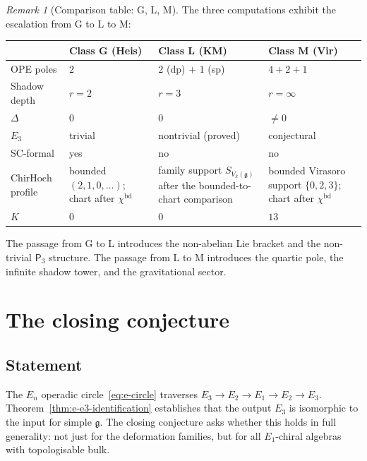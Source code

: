 \documentclass[11pt,reqno]{amsart}
\theoremstyle{definition}
\theoremstyle{remark}
\newtheorem{remark}[theorem]{Remark}
\providecommand{\fg}{\mathfrak{g}}
\providecommand{\Eone}{E_1}
\providecommand{\Etwo}{E_2}
\providecommand{\Ethree}{E_3}
\providecommand{\En}{E_n}
\providecommand{\Pthree}{\mathsf{P}_3}
\providecommand{\ChirHoch}{\mathrm{ChirHoch}}
\begin{document}
\begin{remark}[Comparison table: G, L, M]
\label{rem:e-glm-comparison}
The three computations exhibit the escalation from G to L
to M:
\begin{center}
\renewcommand{\arraystretch}{1.15}
\begin{tabular}{llll}
& \textbf{Class G (Heis)} & \textbf{Class L (KM)} &
 \textbf{Class M (Vir)} \\
\hline
OPE poles & $2$ & $2$ (dp) + $1$ (sp) & $4+2+1$ \\
Shadow depth & $r = 2$ & $r = 3$ & $r = \infty$ \\
$\Delta$ & $0$ & $0$ & $\neq 0$ \\
$\Ethree$ & trivial & nontrivial (proved) &
 conjectural \\
SC-formal & yes & no & no \\
$\ChirHoch$ profile & bounded $(2,1,0,\ldots)$; chart after $\chi^{\mathrm{bd}}$ & family support $S_{V_k(\fg)}$ after the bounded-to-chart comparison & bounded Virasoro support $\{0,2,3\}$; chart after $\chi^{\mathrm{bd}}$ \\
$K$ & $0$ & $0$ & $13$
\end{tabular}
\end{center}
The passage from G to L introduces the non-abelian Lie
bracket and the non-trivial $\Pthree$ structure. The passage
from L to M introduces the quartic pole, the infinite
shadow tower, and the gravitational sector.
\end{remark}


\section{The closing conjecture}
\label{sec:closing-conjecture}

\subsection{Statement}

The $\En$ operadic circle~\eqref{eq:e-circle} traverses
$\Ethree \to \Etwo \to \Eone \to \Etwo \to \Ethree$.
Theorem~\ref{thm:e-e3-identification} establishes that the
output $\Ethree$ is isomorphic to the input for simple $\fg$.
The closing conjecture asks whether this holds in full
generality: not just for the deformation families, but for
all $\Eone$-chiral algebras with topologisable bulk.
\end{document}
